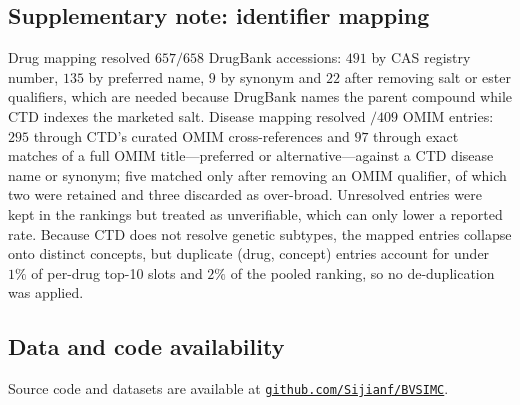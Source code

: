 \subsection*{Supplementary note: identifier mapping}

Drug mapping resolved $657/658$ DrugBank accessions: $491$ by CAS registry
number, $135$ by preferred name, $9$ by synonym and $22$ after removing salt or
ester qualifiers, which are needed because DrugBank names the parent compound
while CTD indexes the marketed salt. Disease mapping resolved $/409$ OMIM
entries: $295$ through CTD's curated OMIM cross-references and $97$ through exact
matches of a full OMIM title---preferred or alternative---against a CTD disease
name or synonym; five matched only after removing an OMIM qualifier, of which two
were retained and three discarded as over-broad. Unresolved entries were kept in
the rankings but treated as unverifiable, which can only lower a reported rate.
Because CTD does not resolve genetic subtypes, the mapped entries collapse onto
 distinct concepts, but duplicate (drug, concept) entries account for
under $1\%$ of per-drug top-10 slots and $2\%$ of the pooled ranking, so no
de-duplication was applied.

\subsection*{Data and code availability}

Source code and datasets are available at
\href{https://github.com/Sijianf/BVSIMC}{\nolinkurl{github.com/Sijianf/BVSIMC}}.

